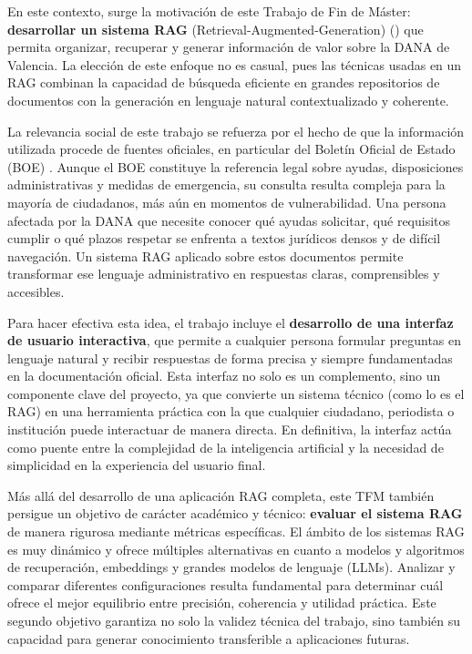 	\noindent En este contexto, surge la motivación de este Trabajo de Fin de Máster: \textbf{desarrollar un sistema RAG} (Retrieval-Augmented-Generation) (\cite{0003_RAGhowitwork,0003_RAGhowitwork2})  que permita organizar, recuperar y generar información de valor sobre la DANA de Valencia. La elección de este enfoque no es casual, pues las técnicas usadas en un RAG combinan la capacidad de búsqueda eficiente en grandes repositorios de documentos con la generación en lenguaje natural contextualizado y coherente.
	
	\noindent La relevancia social de este trabajo se refuerza por el hecho de que la información utilizada procede de fuentes oficiales, en particular del Boletín Oficial de Estado (BOE) \cite{0048_BOE}. Aunque el BOE constituye la referencia legal sobre ayudas, disposiciones administrativas y medidas de emergencia, su consulta resulta compleja para la mayoría de ciudadanos, más aún en momentos de vulnerabilidad. Una persona afectada por la DANA que necesite conocer qué ayudas solicitar, qué requisitos cumplir o qué plazos respetar se enfrenta a textos jurídicos densos y de difícil navegación. Un sistema RAG aplicado sobre estos documentos permite transformar ese lenguaje administrativo en respuestas claras, comprensibles y accesibles.
	
	\noindent Para hacer efectiva esta idea, el trabajo incluye el \textbf{desarrollo de una interfaz de usuario interactiva}, que permite a cualquier persona formular preguntas en lenguaje natural y recibir respuestas de forma precisa y siempre fundamentadas en la documentación oficial. Esta interfaz no solo es un complemento, sino un componente clave del proyecto, ya que convierte un sistema técnico (como lo es el RAG) en una herramienta práctica con la que cualquier ciudadano, periodista o institución puede interactuar de manera directa. En definitiva, la interfaz actúa como puente entre la complejidad de la inteligencia artificial y la necesidad de simplicidad en la experiencia del usuario final.
	
	\noindent Más allá del desarrollo de una aplicación RAG completa, este TFM también persigue un objetivo de carácter académico y técnico: \textbf{evaluar el sistema RAG} de manera rigurosa mediante métricas específicas. El ámbito de los sistemas RAG es muy dinámico y ofrece múltiples alternativas en cuanto a modelos y algoritmos de recuperación, embeddings y grandes modelos de lenguaje (LLMs). Analizar y comparar diferentes configuraciones resulta fundamental para determinar cuál ofrece el mejor equilibrio entre precisión, coherencia y utilidad práctica. Este segundo objetivo garantiza no solo la validez técnica del trabajo, sino también su capacidad para generar conocimiento transferible a aplicaciones futuras.
	
